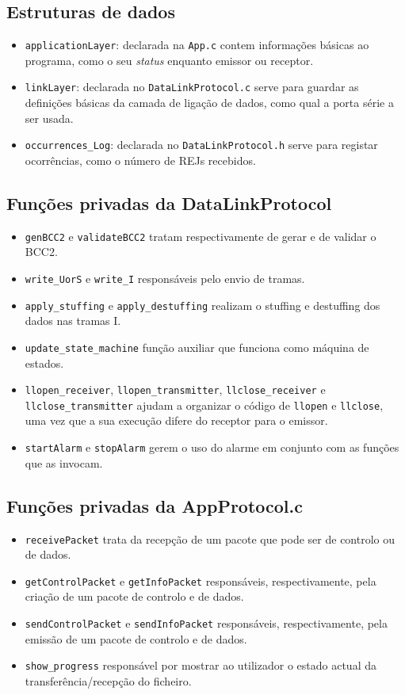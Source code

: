 \documentclass[11pt,a4paper,reqno]{report}
\numberwithin{equation}{section}
\begin{document}
\subsection{Estruturas de dados}
\begin{itemize}
\item \verb|applicationLayer|: declarada na \verb|App.c| contem informações básicas ao programa, como o seu \emph{status} enquanto emissor ou receptor. 	
\item \verb|linkLayer|: declarada no \verb|DataLinkProtocol.c| serve para guardar as definições básicas da camada de ligação de dados, como qual a porta série a ser usada.	
\item \verb|occurrences_Log|: declarada no \verb|DataLinkProtocol.h| serve para registar ocorrências, como o número de REJs recebidos.	
\end{itemize}

\subsection{Funções privadas da DataLinkProtocol}
\begin{itemize}
\item \verb|genBCC2| e \verb|validateBCC2| tratam respectivamente de gerar e de validar o BCC2.
\item \verb|write_UorS| e \verb|write_I| responsáveis pelo envio de tramas.
\item \verb|apply_stuffing| e \verb|apply_destuffing| realizam o stuffing e destuffing dos dados nas tramas I.
\item \verb|update_state_machine| função auxiliar que funciona como máquina de estados.
\item \verb|llopen_receiver|, \verb|llopen_transmitter|, \verb|llclose_receiver| e \verb|llclose_transmitter| ajudam a organizar o código de \verb|llopen| e \verb|llclose|, uma vez que a sua execução difere do receptor para o emissor.
\item \verb|startAlarm| e \verb|stopAlarm| gerem o uso do alarme em conjunto com as funções que as invocam.
\end{itemize}

\subsection{Funções privadas da AppProtocol.c}
\begin{itemize}
\item \verb|receivePacket| trata da recepção de um pacote que pode ser de controlo ou de dados.
\item \verb|getControlPacket| e \verb|getInfoPacket| responsáveis, respectivamente, pela criação de um pacote de controlo e de dados.
\item \verb|sendControlPacket| e \verb|sendInfoPacket| responsáveis, respectivamente, pela emissão de um pacote de controlo e de dados.
\item \verb|show_progress| responsável por mostrar ao utilizador o estado actual da transferência/recepção do ficheiro.
\end{itemize}
\end{document}
